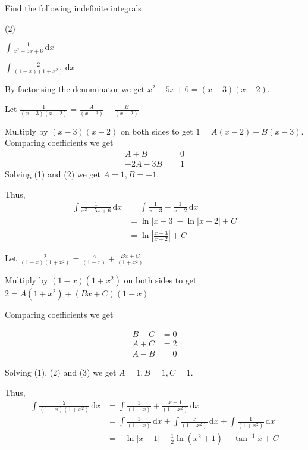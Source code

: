 \documentclass[11pt,a4paper]{book}
\begin{document}
\begin{example}

Find the following indefinite integrals

\begin{tasks}[label=(\alph*),label-width=3.5ex](2)

\task  ${\displaystyle \int\frac{1}{x^{2}-5x+6}\, \mathrm{d}x}$

\task  ${\displaystyle \int\frac{2}{(1-x)(1+x^{2})}\, \mathrm{d}x}$

\end{tasks}

\Solution

\begin{tasks}[label=(\alph*),label-width=3.5ex]

\task  By factorising the denominator we get $x^{2}-5x+6=(x-3)(x-2)$.

Let ${\displaystyle \frac{1}{(x-3)(x-2)}=\frac{A}{(x-3)}+\frac{B}{(x-2)}}$

Multiply by $(x-3)(x-2)$ on both sides to get $1=A(x-2)+B(x-3)$.\\
Comparing coefficients we get\\
\begin{align*}
A+B & =0\tag{1}\\
-2A-3B & =1\tag{2}
\end{align*}
Solving (1) and (2) we get $A=1,B=-1$.

Thus,
\begin{align*}
{\displaystyle \int\frac{1}{x^{2}-5x+6}\, \mathrm{d}x} & =\int\frac{1}{x-3}-\frac{1}{x-2}\, \mathrm{d}x\\
 & =\ln\left|x-3\right|-\ln\left|x-2\right|+C\\
 & =\ln\left|\frac{x-3}{x-2}\right|+C
\end{align*}

\task  Let ${\displaystyle \frac{2}{(1-x)(1+x^{2})}=\frac{A}{(1-x)}+\frac{Bx+C}{(1+x^{2})}}$

Multiply by $(1-x)(1+x^{2})$ on both sides to get $2=A(1+x^{2})+(Bx+C)(1-x)$.

Comparing coefficients we get

\begin{align*}
B-C & =0\tag{1}\\
A+C & =2\tag{2}\\
A-B & =0\tag{3}
\end{align*}

Solving (1), (2) and (3) we get $A=1,B=1,C=1$.

Thus,
\begin{align*}
{\displaystyle \int\frac{2}{(1-x)(1+x^{2})}\, \mathrm{d}x} & =\int\frac{1}{(1-x)}+\frac{x+1}{(1+x^{2})}\, \mathrm{d}x\\
 & =\int\frac{1}{(1-x)}\, \mathrm{d}x+\int\frac{x}{(1+x^{2})}\, \mathrm{d}x+\int\frac{1}{(1+x^{2})}\, \mathrm{d}x\\
 & =-\ln\left|x-1\right|+\frac{1}{2}\ln(x^{2}+1)+\tan^{-1}x+C
\end{align*}

\end{tasks}

\end{example}
\end{document}
